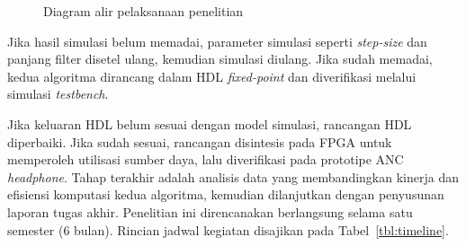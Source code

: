 \begin{figure}[H]
  \caption{Diagram alir pelaksanaan penelitian}
  \label{fig:diagram_alir}
\end{figure}

Jika hasil simulasi belum memadai, parameter simulasi seperti \emph{step-size} dan panjang filter disetel ulang, kemudian simulasi diulang. Jika sudah memadai, kedua algoritma dirancang dalam HDL \emph{fixed-point} dan diverifikasi melalui simulasi \emph{testbench}.

Jika keluaran HDL belum sesuai dengan model simulasi, rancangan HDL diperbaiki. Jika sudah sesuai, rancangan disintesis pada FPGA untuk memperoleh utilisasi sumber daya, lalu diverifikasi pada prototipe ANC \emph{headphone}. Tahap terakhir adalah analisis data yang membandingkan kinerja dan efisiensi komputasi kedua algoritma, kemudian dilanjutkan dengan penyusunan laporan tugas akhir. Penelitian ini direncanakan berlangsung selama satu semester (6 bulan). Rincian jadwal kegiatan disajikan pada Tabel~\ref{tbl:timeline}.

